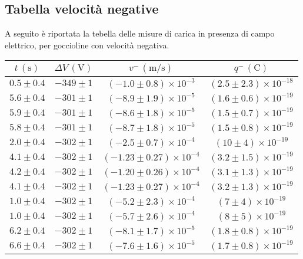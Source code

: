 \subsection{Tabella velocità negative}
A seguito è riportata la tebella delle misure di carica in presenza di campo elettrico, per goccioline con velocità negativa.
        \renewcommand{\arraystretch}{1.3} %
        \begin{longtable}[C]{|c|c|c|c|}
            \hline
            $t \, (\mathrm{s})$ & $\Delta V \, (\mathrm{V})$ & $v^- \, (\mathrm{m/s})$ & $q^- \, (\mathrm{C})$ \\
            \hline
            $0.5 \pm 0.4$ & $-349 \pm 1$ & $(-1.0 \pm 0.8) \times 10^{-3}$ & $(2.5 \pm 2.3) \times 10^{-18}$ \\
            \hline
            $5.6 \pm 0.4$ & $-301 \pm 1$ & $(-8.9 \pm 1.9) \times 10^{-5}$ & $(1.6 \pm 0.6) \times 10^{-19}$ \\
            \hline
            $5.9 \pm 0.4$ & $-301 \pm 1$ & $(-8.6 \pm 1.8) \times 10^{-5}$ & $(1.5 \pm 0.7) \times 10^{-19}$ \\
            \hline
            $5.8 \pm 0.4$ & $-301 \pm 1$ & $(-8.7 \pm 1.8) \times 10^{-5}$ & $(1.5 \pm 0.8) \times 10^{-19}$ \\
            \hline
            $2.0 \pm 0.4$ & $-302 \pm 1$ & $(-2.5 \pm 0.7) \times 10^{-4}$ & $(10 \pm 4) \times 10^{-19}$ \\
            \hline
            $4.1 \pm 0.4$ & $-302 \pm 1$ & $(-1.23 \pm 0.27) \times 10^{-4}$ & $(3.2 \pm 1.5) \times 10^{-19}$ \\
            \hline
            $4.2 \pm 0.4$ & $-302 \pm 1$ & $(-1.20 \pm 0.26) \times 10^{-4}$ & $(3.1 \pm 1.3) \times 10^{-19}$ \\
            \hline
            $4.1 \pm 0.4$ & $-302 \pm 1$ & $(-1.23 \pm 0.27) \times 10^{-4}$ & $(3.2 \pm 1.3) \times 10^{-19}$ \\
            \hline
            $1.0 \pm 0.4$ & $-302 \pm 1$ & $(-5.2 \pm 2.3) \times 10^{-4}$ & $(7 \pm 4) \times 10^{-19}$ \\
            \hline
            $1.0 \pm 0.4$ & $-302 \pm 1$ & $(-5.7 \pm 2.6) \times 10^{-4}$ & $(8 \pm 5) \times 10^{-19}$ \\
            \hline
            $6.2 \pm 0.4$ & $-302 \pm 1$ & $(-8.1 \pm 1.7) \times 10^{-5}$ & $(1.8 \pm 0.8) \times 10^{-19}$ \\
            \hline
            $6.6 \pm 0.4$ & $-302 \pm 1$ & $(-7.6 \pm 1.6) \times 10^{-5}$ & $(1.7 \pm 0.8) \times 10^{-19}$ \\

\end{longtable}
